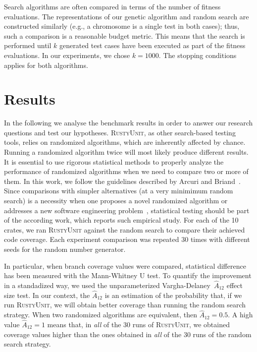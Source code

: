 \documentclass[paper=a4,%
  twoside,%
  BCOR4mm,%
  abstract=true,%
  toc=bibliography,%
  chapterprefix=true,%
  toc=bibliographynumbered,%
  open=right,%
  english,%
  pagesize=pdftex]{scrreprt}
\newcommand{\benchnum}{10\xspace}
\newcommand{\tech}{\textsc{RustyUnit}\xspace}
\newcommand{\runs}{30\xspace}
\newcommand{\budget}{1000\xspace}
\begin{document}
Search algorithms are often compared in terms of the number of fitness evaluations. The representations of our genetic algorithm and random search are constructed similarly (e.g., a chromosome is a single test in both cases); thus, such a comparison is a reasonable budget metric. This means that the search is performed until $k$ generated test cases have been executed as part of the fitness evaluations. In our experiments, we chose $k = \budget$. The stopping conditions applies for both algorithms.

\section{Results}
\label{sec:results}
In the following we analyse the benchmark results in order to answer our research questions and test our hypotheses. \tech, as other search-based testing tools, relies on randomized algorithms, which are inherently affected by chance. Running a randomized algorithm twice will most likely produce different results. It is essential to use rigorous statistical methods to properly analyze the performance of randomized algorithms when we need to compare two or more of them. In this work, we follow the guidelines described by Arcuri and Briand~\cite{Arcuri2011}. Since comparisons with simpler alternatives (at a very minimimum random search) is a necessity when one proposes a novel randomized algorithm or addresses a new software engineering problem~\cite{Ali2010}, statistical testing should be part of the according work, which reports such empirical study. For each of the \benchnum crates, we ran \tech against the random search to compare their achieved code coverage. Each experiment comparison was repeated \runs times with different seeds for the random number generator.  %

In particular, when branch coverage values were compared, statistical difference has been measured with the Mann-Whitney U test. To quantify the improvement in a standadized way, we used the unparameterized Vargha-Delaney~$\hat{A}_{12}$ effect size test. In our context, the $\hat{A}_{12}$ is an estimation of the probability that, if we run \tech, we will obtain better coverage than running the random search strategy. When two randomized algorithms are equivalent, then $\hat{A}_{12} = 0.5$. A high value $\hat{A}_{12} = 1$ means that, in \emph{all} of the \runs runs of \tech, we obtained coverage values higher than the ones obtained in \emph{all} of the \runs runs of the random search strategy.
\end{document}
